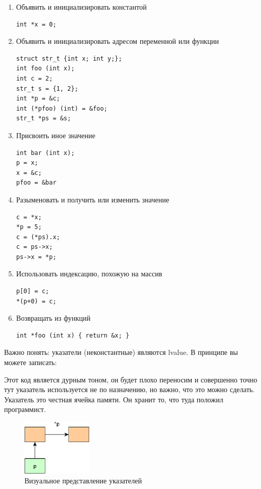 \documentclass[a4paper,12pt,oneside]{article}
\begin{document}
\begin{enumerate}
\item Объявить и инициализировать константой
\begin{lstlisting}
int *x = 0;
\end{lstlisting}
\item Объявить и инициализировать адресом переменной или функции
\begin{lstlisting}
struct str_t {int x; int y;};
int foo (int x);
int c = 2;
str_t s = {1, 2};
int *p = &c;
int (*pfoo) (int) = &foo;
str_t *ps = &s;
\end{lstlisting}
\item Присвоить иное значение
\begin{lstlisting}
int bar (int x);
p = x;
x = &c;
pfoo = &bar
\end{lstlisting}
\item Разыменовать и получить или изменить значение
\begin{lstlisting}
c = *x;
*p = 5;
c = (*ps).x;
c = ps->x;
ps->x = *p;
\end{lstlisting}
\item Использовать индексацию, похожую на массив
\begin{lstlisting}
p[0] = c;
*(p+0) = c;
\end{lstlisting}
\item Возвращать из функций
\begin{lstlisting}
int *foo (int x) { return &x; }
\end{lstlisting}
\end{enumerate}

Важно понять: указатели (неконстантные) являются lvalue. В принципе вы можете записать:



Этот код является дурным тоном, он будет плохо переносим и совершенно точно тут указатель используется не по назначению, но важно, что это можно сделать. Указатель это честная ячейка памяти. Он хранит то, что туда положил программист.

\begin{figure}[h!]
\centering
\includegraphics[width=0.3\textwidth]{illustrations/pointers-crop.pdf}
\caption{Визуальное представление указателей}
\label{fig:pointers-crop}
\end{figure}
\end{document}
